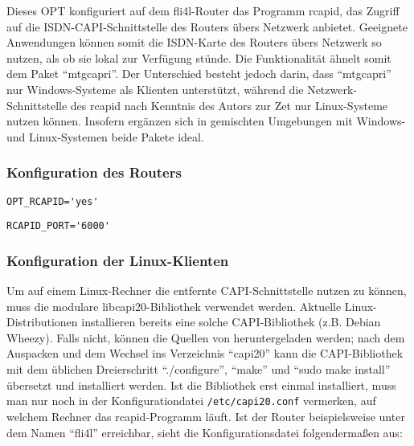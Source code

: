 Dieses OPT konfiguriert auf dem fli4l-Router das Programm rcapid, das Zugriff
auf die ISDN-CAPI-Schnittstelle des Routers übers Netzwerk anbietet. Geeignete
Anwendungen können somit die ISDN-Karte des Routers übers Netzwerk so nutzen,
als ob sie lokal zur Verfügung stünde. Die Funktionalität ähnelt somit dem
Paket ``mtgcapri''. Der Unterschied besteht jedoch darin, dass ``mtgcapri'' nur
Windows-Systeme als Klienten unterstützt, während die Netzwerk-Schnittstelle
des rcapid nach Kenntnis des Autors zur Zet nur Linux-Systeme nutzen können.
Insofern ergänzen sich in gemischten Umgebungen mit Windows- und Linux-Systemen
beide Pakete ideal.

\subsubsection{Konfiguration des Routers}

\begin{description}
\verb*?OPT_RCAPID='yes'?

\verb*?RCAPID_PORT='6000'?
\end{description}

\subsubsection{Konfiguration der Linux-Klienten}
Um auf einem Linux-Rechner die entfernte CAPI-Schnittstelle nutzen zu können,
muss die modulare libcapi20-Bibliothek verwendet werden. Aktuelle
Linux-Distributionen installieren bereits eine solche CAPI-Bibliothek (z.B.
Debian Wheezy). Falls nicht, können die Quellen von
heruntergeladen werden; nach dem Auspacken und dem Wechsel ins Verzeichnis
``capi20'' kann die CAPI-Bibliothek mit dem üblichen Dreierschritt
``./configure'', ``make'' und ``sudo make install'' übersetzt und installiert
werden. Ist die Bibliothek erst einmal installiert, muss man nur noch in der
Konfigurationdatei \texttt{/etc/capi20.conf} vermerken, auf welchem Rechner das
rcapid-Programm läuft. Ist der Router beispielsweise unter dem Namen ``fli4l''
erreichbar, sieht die Konfigurationsdatei folgendermaßen aus:

